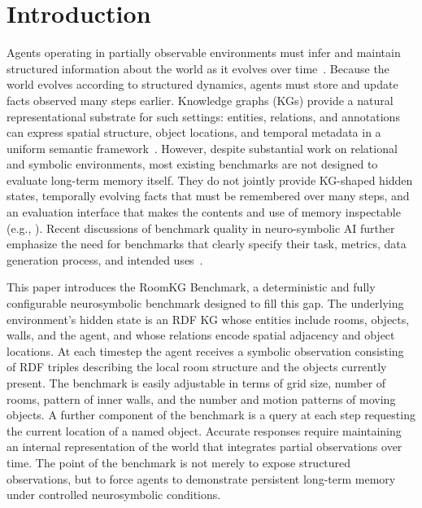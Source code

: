 \documentclass[Afour,sageh,times]{sagej}
\def\volumeyear{2026}
\begin{document}

\def\volumeyear{0000}
\def\volumenumber{XX}
\def\issuenumber{X}
\def\journalname{Testing}

\maketitle

\section{Introduction}

Agents operating in partially observable environments must infer and maintain structured
information about the world as it evolves over time~\citep{KAELBLING199899}. Because the
world evolves according to structured dynamics, agents must store and update facts
observed many steps earlier. Knowledge graphs (KGs) provide a natural representational
substrate for such settings: entities, relations, and annotations can express spatial
structure, object locations, and temporal metadata in a uniform semantic
framework~\citep{ehrlinger2016towards,Hogan_2021,battaglia2018relationalinductivebiasesdeep,zambaldi2018relationaldeepreinforcementlearning}.
However, despite substantial work on relational and symbolic environments, most existing
benchmarks are not designed to evaluate long-term memory itself. They do not jointly
provide KG-shaped hidden states, temporally evolving facts that must be remembered over
many steps, and an evaluation interface that makes the contents and use of memory
inspectable (e.g.,
\citep{battaglia2018relationalinductivebiasesdeep,zambaldi2018relationaldeepreinforcementlearning,Cote2018TextWorld,Hausknecht2020Jericho,Ammanabrolu2020Graph,Wayne2018MERLIN,graves2014neural,graves2016hybrid}).
Recent discussions of benchmark quality in neuro-symbolic AI further emphasize the
need for benchmarks that clearly specify their task, metrics, data generation process,
and intended uses~\citep{Manhaeve2025BenchmarkingNeSy,Bortolotti2024RSBench,Hu2025Text2World}.

This paper introduces the RoomKG Benchmark, a deterministic and fully configurable
neurosymbolic benchmark designed to fill this gap. The underlying environment's hidden state is an RDF KG whose
entities include rooms, objects, walls, and the agent, and whose relations encode
spatial adjacency and object locations. At each timestep the agent receives a symbolic
observation consisting of RDF triples describing the local room structure and the
objects currently present. The benchmark is easily adjustable in terms of grid size,
number of rooms, pattern of inner walls, and the number and motion patterns of moving
objects. A further component of the benchmark is a query at each step requesting the
current location of a named object. Accurate responses require maintaining an internal
representation of the world that integrates partial observations over time. The point of
the benchmark is not merely to expose structured observations, but to force agents to
demonstrate persistent long-term memory under controlled neurosymbolic conditions.
\end{document}
